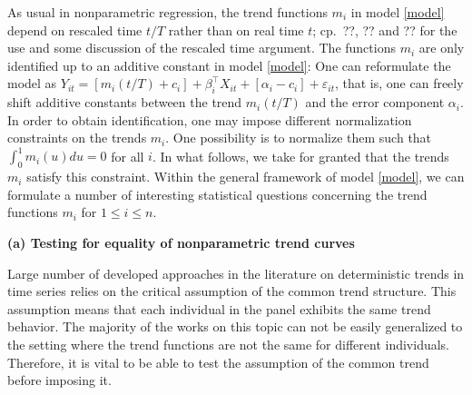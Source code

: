 \documentclass[a4paper,12pt]{article}
\begin{document}
As usual in nonparametric regression, the trend functions $m_i$ in model \eqref{model} depend on rescaled time $t/T$ rather than on real time $t$; cp.\ ??, ?? and ?? for the use and some discussion of the rescaled time argument. The functions $m_i$ are only identified up to an additive constant in model \eqref{model}: One can reformulate the model as $Y_{it} = [m_i(t/T) + c_i] + \beta_i^\top X_{it} + [\alpha_i - c_i] + \varepsilon_{it}$, that is, one can freely shift additive constants between the trend $m_i(t/T)$ and the error component $\alpha_i$. In order to obtain identification, one may impose different normalization constraints on the trends $m_i$. One possibility is to normalize them such that $\int_0^1 m_i(u) du = 0$ for all $i$. In what follows, we take for granted that the trends $m_i$ satisfy this constraint. 
Within the general framework of model \eqref{model}, we can formulate a number of interesting statistical questions concerning the trend functions $m_i$ for $1 \le i \le n$. 
\vspace{15pt}


\noindent \textbf{(a) Testing for equality of nonparametric trend curves } 
\vspace{10pt} 

 
\noindent Large number of developed approaches in the literature on deterministic trends in time series relies on the critical assumption of the common trend structure. This assumption means that each individual in the panel exhibits the same trend behavior. The majority of the works on this topic can not be easily generalized to the setting where the trend functions are not the same for different individuals. Therefore, it is vital to be able to test the assumption of the common trend before imposing it. 
\end{document}
